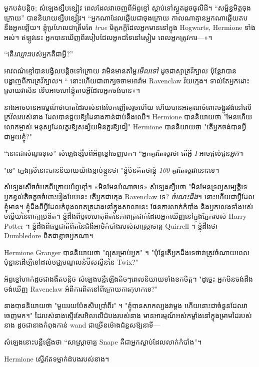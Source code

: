 {{{{{{មួកបត់បន្តិច; សំឡេងខ្សឹបខ្សៀវ ពេលដែលវាចេញពីអ័ព្ទខ្មៅ ស្តាប់ទៅស្ងួតដូចធូលីដី។ “សម្ព័ន្ធមិត្តចុងក្រោយ” បាននិយាយខ្សឹបខ្សៀវ។ “អ្នក​ណា​ដែល​ឆ្លើយ​ជា​ចុង​ក្រោយ កាល​ណា​គ្មាន​អ្នក​ណា​ឆ្លើយ​តប​នឹង​អ្នក​ឡើយ។ ខ្ញុំប្រហែលជាត្រឹមតែ \emph{true} មិត្តភក្តិដែលអ្នកមាននៅក្នុង Hogwarts, Hermione ទាំងអស់។ ឥឡូវ​នេះ អ្នក​បាន​ឃើញ​ពី​របៀប​ដែល​អ្នក​ដទៃ​នៅ​ស្ងៀម ពេល​អ្នក​ត្រូវ​ការ—»។

“តើ\emph{ឈ្មោះ}របស់អ្នកគឺជាអ្វី?”

អាវពណ៌ខ្មៅបានបង្វិលបន្តិចទៅក្រោយ វាមិនមានតម្លៃ\emph{មើលទៅ} ដូចជាស្មាគ្រវីក្បាល ប៉ុន្តែវាបានបង្ហាញពីការគ្រវីក្បាល។ “ នោះហើយជាពាក្យចចាមអារ៉ាម Ravenclaw វ័យក្មេង។ ទាល់តែ​អ្នក​ដោះស្រាយ​វា​សិន ទើប​អាច​ហៅ​ខ្ញុំ​តាម​អ្វី​ដែល​អ្នក​ចង់បាន​»​។

នាង​អាច​មាន​អារម្មណ៍​ថា​បាតដៃ​របស់​នាង​បែក​ញើស​រួច​ហើយ ហើយ​បាន​អរគុណ​ចំពោះ​ចង្អូរ​វង់​នៅ​លើ​ក្រវិល​របស់​នាង ដែល​បាន​ជួយ​ឱ្យ​ដៃ​នាង​កាន់​ជាប់​នឹង​ឈើ។ Hermione បាននិយាយថា "មែនហើយ លោកម្ចាស់ មនុស្សដែលគួរឱ្យសង្ស័យមិនគួរឱ្យជឿ" Hermione បាននិយាយថា "តើអ្នកចង់បានអ្វីជាមួយខ្ញុំ?"

“នោះជាសំណួរខុស” សំឡេងខ្សឹបពីអ័ព្ទខ្មៅចេញមក។ “អ្នកគួរតែសួរថា តើអ្វី \emph{I} អាចផ្តល់ជូន\emph{អ្នក}។

"ទេ" ក្មេងស្រីនោះបាននិយាយយ៉ាងខ្ជាប់ខ្ជួនថា "ខ្ញុំមិនគិតថាខ្ញុំ \emph{100} គួរតែសួរវានោះទេ។

សំឡេងសើចចំអកពីក្រោយអ័ព្ទខ្មៅ។ «មិនមែនអំណាចទេ» សំឡេងខ្សឹបថា "មិនមែនទ្រព្យសម្បត្តិទេ អ្នកខ្វល់តិចតួចចំពោះរឿងបែបនេះ តើអ្នកជាក្មេង Ravenclaw ទេ? \emph{ចំណេះដឹង}។ នោះហើយជាអ្វីដែលខ្ញុំមាន។ ខ្ញុំដឹងពីអ្វីដែលកំពុងលាតត្រដាងនៅក្នុងសាលានេះ ផែនការលាក់កំបាំង និងអ្នកលេងទាំងអស់ ចម្លើយនៃពាក្យប្រឌិត។ ខ្ញុំដឹងពីមូលហេតុពិតនៃភាពត្រជាក់ដែលអ្នកឃើញនៅក្នុងភ្នែករបស់ Harry Potter ។ ខ្ញុំដឹងពីធម្មជាតិពិតនៃជំងឺអាថ៌កំបាំងរបស់សាស្រ្តាចារ្យ Quirrell ។ ខ្ញុំដឹងថា Dumbledore ពិតជាខ្លាចអ្នកណា។

Hermione Granger បាននិយាយថា "ល្អសម្រាប់អ្នក" ។ "ប៉ុន្តែតើអ្នកដឹងទេថាវាត្រូវចំណាយពេលប៉ុន្មានដើម្បីទៅដល់មជ្ឈមណ្ឌលនំប៊ីសស្ទីននៃ Twix?"

អ័ព្ទខ្មៅហាក់ដូចជាងងឹតបន្តិច សំឡេងបន្លឺឡើងតិចៗពេលនិយាយទាំងខកចិត្ត។ "ដូច្នេះ អ្នកមិនចង់ដឹងចង់ឃើញ Ravenclaw អំពីការពិតនៅពីក្រោយការកុហកទេ?"

នាងបាននិយាយថា "មួយរយប៉ែតសិបប្រាំពីរ" ។ "ខ្ញុំបានសាកល្បងវាម្តង ហើយនោះជាចំនួនដែលវាចេញមក។" ដៃរបស់នាងស្ទើរតែរអិលលើដំបងរបស់នាង មានអារម្មណ៍អស់កម្លាំងនៅក្នុងម្រាមដៃរបស់នាង ដូចជានាងកំពុងកាន់ wand ជាច្រើនម៉ោងជំនួសឱ្យនាទី—

សំឡេង​នោះ​បន្លឺ​ឡើង​ថា “សាស្ត្រាចារ្យ Snape គឺ​ជា​អ្នក​ស្លាប់​ដែល​លាក់​កំបាំង”។

Hermione ស្ទើរតែទម្លាក់ដំបងរបស់នាង។

}}}}}}

